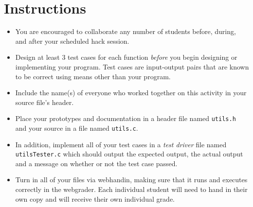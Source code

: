 \documentclass[12pt]{scrartcl}
\begin{document}
\section*{Instructions}

\begin{itemize}
  \item You are encouraged to collaborate any number of students 
  before, during, and after your scheduled hack session.  
  \item Design at least 3 test cases for each function
  \emph{before} you begin
  designing or implementing your program.  Test cases are 
  input-output pairs that are known to be correct using means
  other than your program.
  \item Include the name(s) of everyone who worked together on
  this activity in your source file's header.
  \item Place your prototypes and documentation in a header file 
  named \texttt{utils.h} and your source in a file
  named \texttt{utils.c}.
  \item In addition, implement all of your test cases in a
  \emph{test driver} file named \texttt{utilsTester.c}
  which should output the expected output, the actual output and
  a message on whether or not the test case passed.
  \item Turn in all of your files via webhandin, making sure that 
  it runs and executes correctly in the webgrader.  Each individual 
  student will need to hand in their own copy and will receive 
  their own individual grade.
\end{itemize}
  
\end{document}
